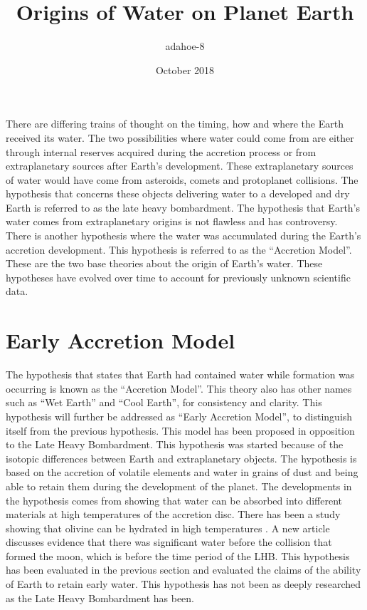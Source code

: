 \documentclass{article}
\title{Origins of Water on Planet Earth}
\author{adahoe-8 }
\date{October 2018}
\begin{document}
\maketitle

There are differing trains of thought on the timing, how and where the Earth received its water. The two possibilities where water could come from are either through internal reserves acquired during the accretion process or from extraplanetary sources after Earth’s development. These extraplanetary sources of water would have come from asteroids, comets and protoplanet collisions. The hypothesis that concerns these objects delivering water to a developed and dry Earth is referred to as the late heavy bombardment. The hypothesis that Earth’s water comes from extraplanetary origins is not flawless and has controversy. There is another hypothesis where the water was accumulated during the Earth’s accretion development. This hypothesis is referred to as the “Accretion Model”. These are the two base theories about the origin of Earth’s water. These hypotheses have evolved over time to account for previously unknown scientific data.

\section{Early Accretion Model}
The hypothesis that states that Earth had contained water while formation was occurring is known as the “Accretion Model”. This theory also has other names such as “Wet Earth” and “Cool Earth”, for consistency and clarity. This hypothesis will further be addressed as “Early Accretion Model”, to distinguish itself from the previous hypothesis. This model has been proposed in opposition to the Late Heavy Bombardment. This hypothesis was started because of the isotopic differences between Earth and extraplanetary objects. The hypothesis is based on the accretion of volatile elements and water in grains of dust and being able to retain them during the development of the planet. The developments in the hypothesis comes from showing that water can be absorbed into different materials at high temperatures of the accretion disc. There has been a study showing that olivine can be hydrated in high temperatures \cite{BOMB11} \cite{BOMB12}. A new article \cite{BOMB13} discusses evidence that there was significant water before the collision that formed the moon, which is before the time period of the LHB. This hypothesis has been evaluated in the previous section and evaluated the claims of the ability of Earth to retain early water. This hypothesis has not been as deeply researched as the Late Heavy Bombardment has been.
\end{document}
